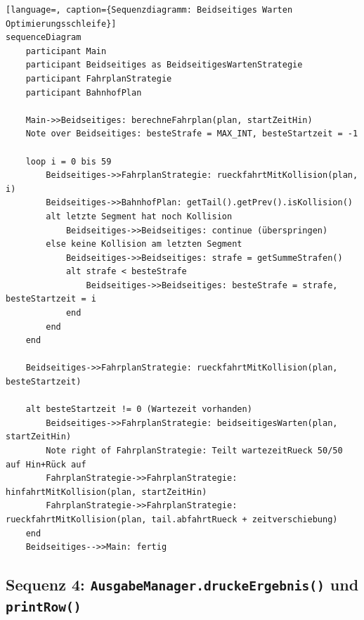 \documentclass[12pt,a4paper]{article}
\begin{document}
\begin{lstlisting}[language=, caption={Sequenzdiagramm: Beidseitiges Warten Optimierungsschleife}]
sequenceDiagram
    participant Main
    participant Beidseitiges as BeidseitigesWartenStrategie
    participant FahrplanStrategie
    participant BahnhofPlan

    Main->>Beidseitiges: berechneFahrplan(plan, startZeitHin)
    Note over Beidseitiges: besteStrafe = MAX_INT, besteStartzeit = -1

    loop i = 0 bis 59
        Beidseitiges->>FahrplanStrategie: rueckfahrtMitKollision(plan, i)
        Beidseitiges->>BahnhofPlan: getTail().getPrev().isKollision()
        alt letzte Segment hat noch Kollision
            Beidseitiges->>Beidseitiges: continue (überspringen)
        else keine Kollision am letzten Segment
            Beidseitiges->>Beidseitiges: strafe = getSummeStrafen()
            alt strafe < besteStrafe
                Beidseitiges->>Beidseitiges: besteStrafe = strafe, besteStartzeit = i
            end
        end
    end

    Beidseitiges->>FahrplanStrategie: rueckfahrtMitKollision(plan, besteStartzeit)

    alt besteStartzeit != 0 (Wartezeit vorhanden)
        Beidseitiges->>FahrplanStrategie: beidseitigesWarten(plan, startZeitHin)
        Note right of FahrplanStrategie: Teilt wartezeitRueck 50/50 auf Hin+Rück auf
        FahrplanStrategie->>FahrplanStrategie: hinfahrtMitKollision(plan, startZeitHin)
        FahrplanStrategie->>FahrplanStrategie: rueckfahrtMitKollision(plan, tail.abfahrtRueck + zeitverschiebung)
    end
    Beidseitiges-->>Main: fertig
\end{lstlisting}

\subsection{Sequenz 4: \texttt{AusgabeManager.druckeErgebnis()} und \texttt{printRow()}}
\end{document}
